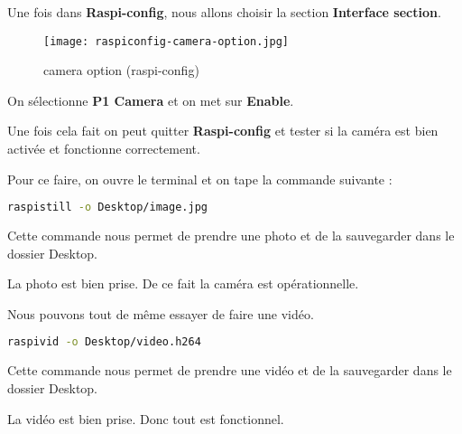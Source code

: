             \begin{flushleft}
                
                Une fois dans \textbf{Raspi-config}, nous allons choisir la section \textbf{Interface section}.
            
                \begin{figure}[ht]
                    \centering
                    \texttt{[image: raspiconfig-camera-option.jpg]} 
                    \caption{camera option (raspi-config)}
                \end{figure}

                On sélectionne \textbf{P1 Camera} et on met sur \textbf{Enable}.

                \vspace{0.2cm}

                Une fois cela fait on peut quitter \textbf{Raspi-config} et tester si la caméra est bien activée et fonctionne correctement.

                \vspace{0.2cm}

                Pour ce faire, on ouvre le terminal et on tape la commande suivante :

                \begin{flushleft}
                    \begin{lstlisting}[language=bash]
                        raspistill -o Desktop/image.jpg
                    \end{lstlisting}
                \end{flushleft}

                Cette commande nous permet de prendre une photo et de la sauvegarder dans le dossier Desktop.

                \vspace{0.2cm}

                La photo est bien prise. De ce fait la caméra est opérationnelle.

                Nous pouvons tout de même essayer de faire une vidéo.

                \begin{flushleft}
                    \begin{lstlisting}[language=bash]
                        raspivid -o Desktop/video.h264
                    \end{lstlisting}
                \end{flushleft}

                Cette commande nous permet de prendre une vidéo et de la sauvegarder dans le dossier Desktop.

                \vspace{0.2cm}

                La vidéo est bien prise. Donc tout est fonctionnel.
                
            \end{flushleft}

